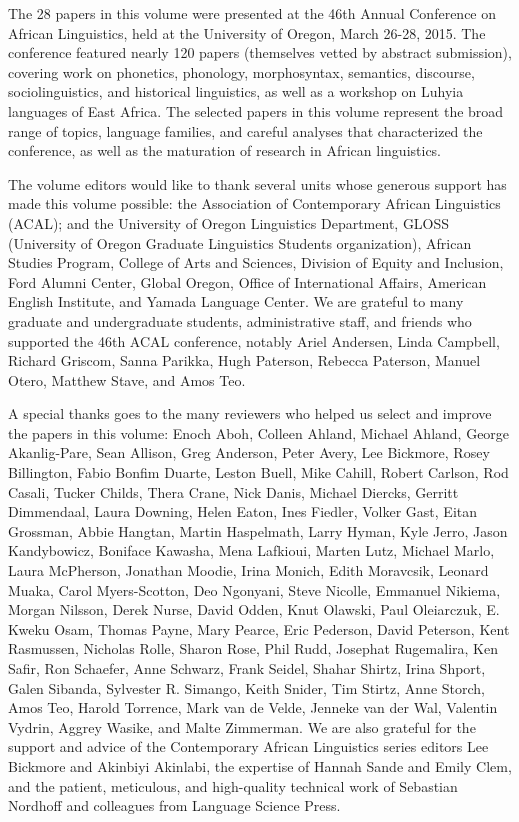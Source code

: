 \largerpage
The 28 papers in this volume were presented at the 46th Annual Conference on African Linguistics, held at the University of Oregon, March 26-28, 2015. The conference featured nearly 120 papers (themselves vetted by abstract submission), covering work on phonetics, phonology, morphosyntax, semantics, discourse, sociolinguistics, and historical linguistics, as well as a workshop on Luhyia languages of East Africa. The selected papers in this volume represent the broad range of topics, language families, and careful analyses that characterized the conference, as well as the maturation of research in African linguistics. 

The volume editors would like to thank several units whose generous support has made this volume possible: the Association of Contemporary African Linguistics (ACAL); 
and the University of Oregon Linguistics Department, 
 GLOSS (University of Oregon Graduate Linguistics Students organization), 
 African Studies Program, 
 College of Arts and Sciences, 
 Division of Equity and Inclusion, 
 Ford Alumni Center, 
 Global Oregon, 
 Office of International Affairs,
 American English Institute, 
 and Yamada Language Center.
We are grateful to many graduate and undergraduate students, administrative staff, and friends who supported the 46th ACAL conference, notably 
  Ariel Andersen, 
  Linda Campbell, 
  Richard Griscom, 
  Sanna Parikka, 
  Hugh Paterson, 
  Rebecca Paterson, 
  Manuel Otero, 
  Matthew Stave, 
  and Amos Teo.

A special thanks goes to the many reviewers who helped us select and improve the papers in this volume: 
Enoch Aboh,
Colleen Ahland,
Michael Ahland,
George Akanlig-Pare,
Sean Allison,
Greg Anderson,
Peter Avery,
Lee Bickmore,
Rosey Billington,
Fabio Bonfim Duarte,
Leston Buell,
Mike Cahill,
Robert Carlson,
Rod Casali,
Tucker Childs,
Thera Crane,
Nick Danis,
Michael Diercks,
Gerritt Dimmendaal,
Laura Downing,
Helen Eaton,
Ines Fiedler,
Volker Gast,
Eitan Grossman,
Abbie Hangtan,
Martin Haspelmath,
Larry Hyman,
Kyle Jerro,
Jason Kandybowicz,
Boniface Kawasha,
Mena Lafkioui,
Marten Lutz,
Michael Marlo,
Laura McPherson,
Jonathan Moodie,
Irina Monich,
Edith Moravcsik,
Leonard Muaka,
Carol Myers-Scotton,
Deo Ngonyani,
Steve Nicolle,
Emmanuel Nikiema,
Morgan Nilsson,
Derek Nurse,
David Odden,
Knut Olawski,
Paul Oleiarczuk,
E. Kweku Osam,
Thomas Payne,
Mary Pearce,
Eric Pederson,
David Peterson,
Kent Rasmussen,
Nicholas Rolle,
Sharon Rose,
Phil Rudd,
Josephat Rugemalira,
Ken Safir,
Ron Schaefer,
Anne Schwarz,
Frank Seidel,
Shahar Shirtz,
Irina Shport,
Galen Sibanda,
Sylvester R. Simango,
Keith Snider,
Tim Stirtz,
Anne Storch,
Amos Teo,
Harold Torrence,
Mark van de Velde,
Jenneke van der Wal,
Valentin Vydrin,
Aggrey Wasike,
and Malte Zimmerman.
 We are also grateful for the support and advice of the Contemporary African Linguistics series editors Lee Bickmore and Akinbiyi Akinlabi, the expertise of Hannah Sande and Emily Clem, and the patient, meticulous, and high-quality technical work of Sebastian Nordhoff and colleagues from Language Science Press. 